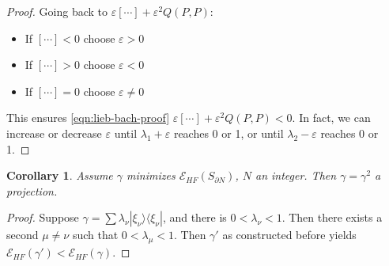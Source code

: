 \documentclass[11pt]{amsart}
\newtheorem{cor}{Corollary}
\theoremstyle{definition}
\theoremstyle{definition}
\theoremstyle{definition}
\numberwithin{equation}{section}
\begin{document}
\begin{proof}
Going back to $\varepsilon[\cdots]+\varepsilon^2Q(P,P)$:
\begin{itemize}
\item If $[\cdots]<0$ choose $\varepsilon>0$
\item If $[\cdots]>0$ choose $\varepsilon<0$
\item If $[\cdots]=0$ choose $\varepsilon\ne0$
\end{itemize}
This ensures \eqref{eqn:lieb-bach-proof} $\varepsilon[\cdots]+\varepsilon^2Q(P,P)<0$. In fact, we can increase or decrease $\varepsilon$ until $\lambda_1+\varepsilon$ reaches 0 or 1, or until $\lambda_2-\varepsilon$ reaches 0 or 1.
\end{proof}

\begin{cor}
Assume $\gamma$ minimizes $\mathcal{E}_{HF}(S_{\partial N})$, $N$ an integer. Then $\gamma=\gamma^2$ a projection.
\end{cor}
\begin{proof}
Suppose $\gamma=\sum \lambda_\nu|\xi_\nu\rangle\langle\xi_\nu|$, and there is $0<\lambda_\nu<1$. Then there exists a second $\mu\ne\nu$ such that $0<\lambda_\mu<1$. Then $\gamma'$ as constructed before yields $\mathcal{E}_{HF}(\gamma')<\mathcal{E}_{HF}(\gamma)$.
\end{proof}
\end{document}

